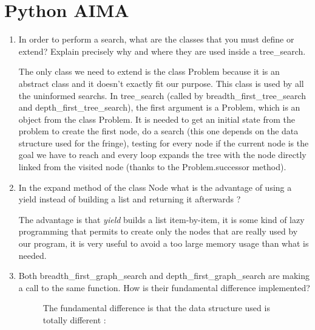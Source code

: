 \section{Python AIMA}

\begin{enumerate}
    \item In order to perform a search, what are the classes that you
        must define or extend? Explain precisely why and where they are
        used inside a tree\_search.
        \begin{framed}
            The only class we need to extend is the class Problem because
            it is an abstract class and it doesn't exactly fit our purpose.
            This class is used by all the uninformed searchs. In
            tree\_search (called by breadth\_first\_tree\_search and
            depth\_first\_tree\_search), the first argument is a Problem,
            which is an object from the class Problem. It is needed to get
            an initial state from the problem to create the first node, do a search (this one
            depends on the data structure used for the fringe), testing
            for every node if the current node is the goal we have to
            reach and every loop expands the tree with the node directly
            linked from the visited node (thanks to the Problem.successor
            method).
        \end{framed}
    \item In the expand method of the class Node what is the advantage
        of using a yield instead of building a list and returning it
        afterwards ?
        \begin{framed}
            The advantage is that \textit{yield} builds a list item-by-item, it is
            some kind of lazy programming that permits to create only the
            nodes that are really used by our program, it is very useful to
            avoid a too large memory usage than what is needed.
        \end{framed}
    \item Both breadth\_first\_graph\_search and depth\_first\_graph\_search
        are making a call to the same function. How is their fundamental
        difference implemented?
        \begin{figure}[!ht]
        \begin{framed}
            The fundamental difference is that the data structure used is
            totally different :
            \begin{description}

\end{description}
\end{framed}
\end{figure}
\end{enumerate}
